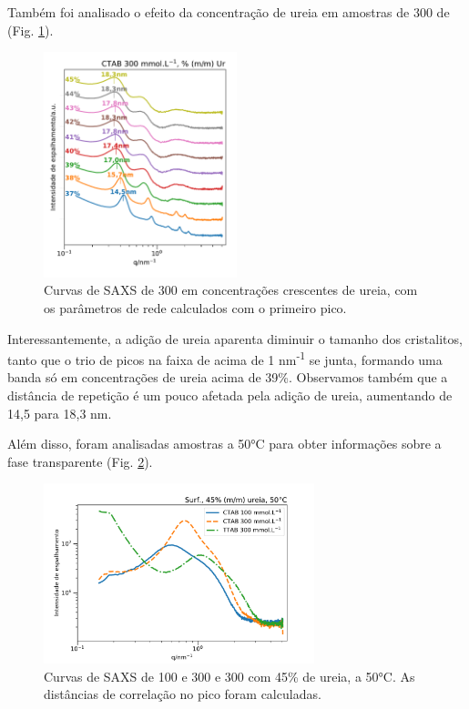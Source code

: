 	
	Também foi analisado o efeito da concentração de ureia em amostras de 300 \mM{} de \CTAB{} (Fig. \ref{fig:SAXS_ctab300ur37-45}).
	
	\begin{figure}[h]
		\centering
		\includegraphics[width=0.5\textwidth]{imagens/saxs/CTAB300Ur37-45}
		\caption{Curvas de SAXS de \CTAB{} 300 \mM{} em concentrações crescentes de ureia, com os parâmetros de rede calculados com o primeiro pico.}
		\label{fig:SAXS_ctab300ur37-45}
	\end{figure}
	
	Interessantemente, a adição de ureia aparenta diminuir o tamanho dos cristalitos, tanto que o trio de picos na faixa de \q{} acima de 1 nm\textsuperscript{-1} se junta, formando uma banda só em concentrações de ureia acima de 39\%. Observamos também que a distância de repetição é um pouco afetada pela adição de ureia, aumentando de 14,5 para 18,3 nm.
	
	Além disso, foram analisadas amostras a 50°C para obter informações sobre a fase transparente (Fig. \ref{fig:SAXS_surf50c}).
	
	\begin{figure}[h]
		\centering
		\includegraphics[width=0.7\textwidth]{imagens/saxs/Surf_50C}
		\caption{Curvas de SAXS de \CTAB{} 100 e 300 \mM{} e \TTAB{} 300 \mM{} com 45\% de ureia, a 50°C. As distâncias de correlação no pico foram calculadas.}
		\label{fig:SAXS_surf50c}
	\end{figure}

